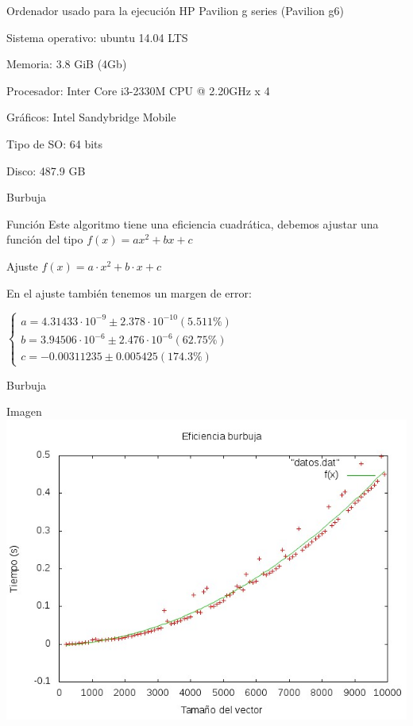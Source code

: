 \documentclass[compress]{beamer}
\begin{document}
\begin{frame}
	\begin{alertblock}{Ordenador usado para la ejecuci\'on}
	HP Pavilion g series (Pavilion g6)

	Sistema operativo: ubuntu 14.04 LTS

	Memoria: 3.8 GiB (4Gb)

	Procesador: Inter Core i3-2330M CPU @ 2.20GHz x 4

	Gráficos: Intel Sandybridge Mobile

	Tipo de SO: 64 bits

	Disco: 487.9 GB	
	\end{alertblock}
\end{frame}


\begin{frame}{Burbuja}
	\begin{block}{Función}
	Este algoritmo tiene una eficiencia cuadrática, debemos ajustar una función del tipo
	$f(x)= ax^2 + bx +c$
	\end{block}
	\pause

	\begin{block}{Ajuste}
	$f(x) = a\cdot x^2 + b\cdot x + c$
	
	En el ajuste también tenemos un margen de error:
	
	$\left\{ \begin{array}{c}
	a               = 4.31433\cdot 10^{-9}      \pm 2.378\cdot 10^{-10}    (5.511\%) \\
	b               = 3.94506\cdot 10^{-6}      \pm 2.476\cdot 10^{-6}    (62.75\%) \\
	c               = -0.00311235     \pm 0.005425     (174.3\%)
	\end{array}\right.$
	\end{block}
\end{frame}

\begin{frame}{Burbuja}	
	\begin{alertblock}{Imagen}
	\includegraphics[scale=0.55]{../Graficas/Burbuja/burbujaO0_ruben.jpeg}
	\end{alertblock}
\end{frame}
\end{document}
